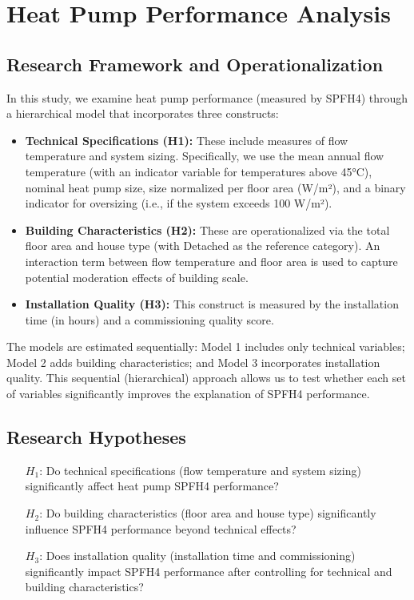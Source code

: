 \documentclass{article}
\begin{document}
\section{Heat Pump Performance Analysis}

\subsection{Research Framework and Operationalization}
In this study, we examine heat pump performance (measured by SPFH4) through a hierarchical model that incorporates three constructs:
\begin{itemize}
    \item \textbf{Technical Specifications (H1):} These include measures of flow temperature and system sizing. Specifically, we use the mean annual flow temperature (with an indicator variable for temperatures above 45°C), nominal heat pump size, size normalized per floor area (W/m²), and a binary indicator for oversizing (i.e., if the system exceeds 100 W/m²).
    \item \textbf{Building Characteristics (H2):} These are operationalized via the total floor area and house type (with Detached as the reference category). An interaction term between flow temperature and floor area is used to capture potential moderation effects of building scale.
    \item \textbf{Installation Quality (H3):} This construct is measured by the installation time (in hours) and a commissioning quality score.
\end{itemize}
The models are estimated sequentially: Model 1 includes only technical variables; Model 2 adds building characteristics; and Model 3 incorporates installation quality. This sequential (hierarchical) approach allows us to test whether each set of variables significantly improves the explanation of SPFH4 performance.

\subsection{Research Hypotheses}
\begin{enumerate}
\item[$H_1$:] Do technical specifications (flow temperature and system sizing) significantly affect heat pump SPFH4 performance?
\item[$H_2$:] Do building characteristics (floor area and house type) significantly influence SPFH4 performance beyond technical effects?
\item[$H_3$:] Does installation quality (installation time and commissioning) significantly impact SPFH4 performance after controlling for technical and building characteristics?
\end{enumerate}
\end{document}
